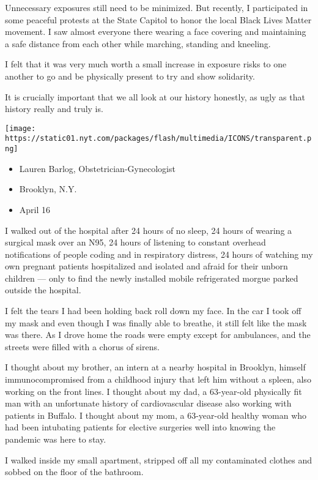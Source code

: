 Unnecessary exposures still need to be minimized. But recently, I
participated in some peaceful protests at the State Capitol to honor the
local Black Lives Matter movement. I saw almost everyone there wearing a
face covering and maintaining a safe distance from each other while
marching, standing and kneeling.

I felt that it was very much worth a small increase in exposure risks to
one another to go and be physically present to try and show solidarity.

It is crucially important that we all look at our history honestly, as
ugly as that history really and truly is.

\texttt{[image: https://static01.nyt.com/packages/flash/multimedia/ICONS/transparent.png]}

\begin{itemize}
\tightlist
\item
  Lauren Barlog, Obstetrician-Gynecologist
\item
  Brooklyn, N.Y.
\item
  April 16
\end{itemize}

I walked out of the hospital after 24 hours of no sleep, 24 hours of
wearing a surgical mask over an N95, 24 hours of listening to constant
overhead notifications of people coding and in respiratory distress, 24
hours of watching my own pregnant patients hospitalized and isolated and
afraid for their unborn children --- only to find the newly installed
mobile refrigerated morgue parked outside the hospital.

I felt the tears I had been holding back roll down my face. In the car I
took off my mask and even though I was finally able to breathe, it still
felt like the mask was there. As I drove home the roads were empty
except for ambulances, and the streets were filled with a chorus of
sirens.

I thought about my brother, an intern at a nearby hospital in Brooklyn,
himself immunocompromised from a childhood injury that left him without
a spleen, also working on the front lines. I thought about my dad, a
63-year-old physically fit man with an unfortunate history of
cardiovascular disease also working with patients in Buffalo. I thought
about my mom, a 63-year-old healthy woman who had been intubating
patients for elective surgeries well into knowing the pandemic was here
to stay.

I walked inside my small apartment, stripped off all my contaminated
clothes and sobbed on the floor of the bathroom.

